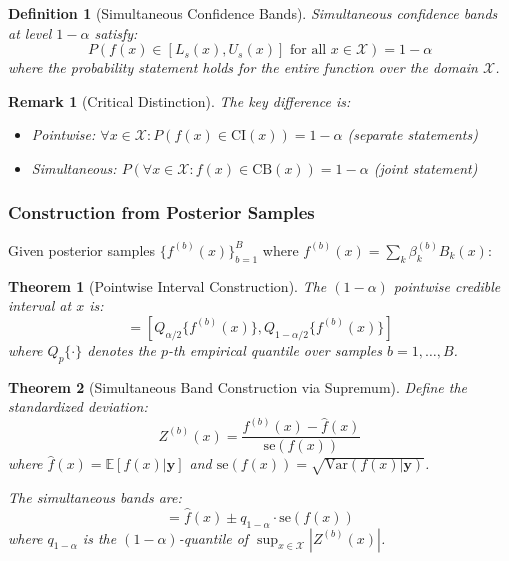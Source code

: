 \documentclass[12pt]{article}
\newtheorem{theorem}{Theorem}
\newtheorem{definition}{Definition}
\newtheorem{remark}{Remark}
\begin{document}
\begin{definition}[Simultaneous Confidence Bands]
Simultaneous confidence bands at level $1-\alpha$ satisfy:
\begin{equation}
P\left(f(x) \in [L_s(x), U_s(x)] \text{ for all } x \in \mathcal{X}\right) = 1-\alpha
\end{equation}
where the probability statement holds for the entire function over the domain $\mathcal{X}$.
\end{definition}

\begin{remark}[Critical Distinction]
The key difference is:
\begin{itemize}
   \item Pointwise: $\forall x \in \mathcal{X}: P(f(x) \in \text{CI}(x)) = 1-\alpha$ (separate statements)
   \item Simultaneous: $P(\forall x \in \mathcal{X}: f(x) \in \text{CB}(x)) = 1-\alpha$ (joint statement)
\end{itemize}
\end{remark}

\subsubsection{Construction from Posterior Samples}

Given posterior samples $\{f^{(b)}(x)\}_{b=1}^B$ where $f^{(b)}(x) = \sum_k \beta_k^{(b)} B_k(x)$:

\begin{theorem}[Pointwise Interval Construction]
The $(1-\alpha)$ pointwise credible interval at $x$ is:
\begin{equation}
[L_p(x), U_p(x)] = \left[Q_{\alpha/2}\{f^{(b)}(x)\}, Q_{1-\alpha/2}\{f^{(b)}(x)\}\right]
\end{equation}
where $Q_p\{\cdot\}$ denotes the $p$-th empirical quantile over samples $b = 1, \ldots, B$.
\end{theorem}

\begin{theorem}[Simultaneous Band Construction via Supremum]
Define the standardized deviation:
\begin{equation}
Z^{(b)}(x) = \frac{f^{(b)}(x) - \hat{f}(x)}{\text{se}(f(x))}
\end{equation}
where $\hat{f}(x) = \mathbb{E}[f(x)|\mathbf{y}]$ and $\text{se}(f(x)) = \sqrt{\text{Var}(f(x)|\mathbf{y})}$.

The simultaneous bands are:
\begin{equation}
[L_s(x), U_s(x)] = \hat{f}(x) \pm q_{1-\alpha} \cdot \text{se}(f(x))
\end{equation}
where $q_{1-\alpha}$ is the $(1-\alpha)$-quantile of $\sup_{x \in \mathcal{X}} |Z^{(b)}(x)|$.
\end{theorem}
\end{document}
